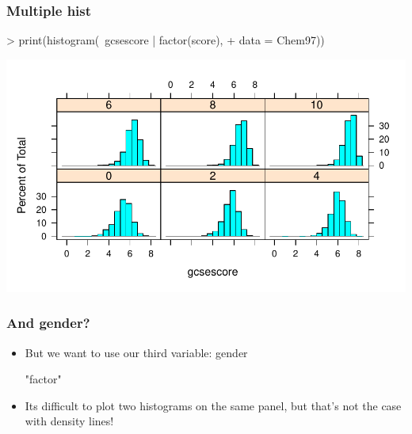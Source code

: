 \begin{frame}
  \frametitle{Multiple hist}
\begin{Schunk}
\begin{Sinput}
> print(histogram(~gcsescore | factor(score), 
+     data = Chem97))
\end{Sinput}
\end{Schunk}
\includegraphics{plots/fig-010}
\end{frame}

\begin{frame}
  \frametitle{And gender?}
  \begin{itemize}
  \item But we want to use our third variable: gender
\begin{Schunk}
\begin{Soutput}
[1] "factor"
\end{Soutput}
\end{Schunk}
  \item Its \alert{difficult} to plot two histograms on the same panel, but that's not the case with density lines!
  \end{itemize}
\end{frame}

